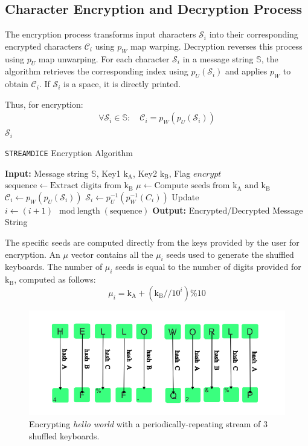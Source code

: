 \documentclass{article}
\begin{document}
\subsection{Character Encryption and Decryption Process}
The encryption process transforms input characters $\mathcal{S}_i$ into their corresponding encrypted characters $\mathcal{C}_i$ using \( p_W \) map warping. Decryption reverses this process using \( p_U \) map unwarping. For each character \( \mathcal{S}_i \) in a message string $\mathbb{S}$, the algorithm retrieves the corresponding index using \( p_U(\mathcal{S}_i) \) and applies \( p_W \) to obtain $\mathcal{C}_i$. If \( \mathcal{S}_i \) is a space, it is directly printed.

Thus, for encryption:
\begin{align}
  \forall \mathcal{S}_i \in \mathbb{S}: \quad \mathcal{C}_i = p_W(p_U(\mathcal{S}_i))
\end{align}$\mathcal{S}_i$
\begin{algorithm}
\caption{\texttt{STREAMDICE} Encryption Algorithm}
\begin{algorithmic}[1]
\State \textbf{Input:} Message string $\mathbb{S}$, Key1 $\mathrm{k_A}$, Key2 $\mathrm{k_B}$, Flag $encrypt$
\State $\text{sequence} \gets \text{Extract digits from } \mathrm{k_B}$
\State $\mu \gets \text{Compute seeds from } \mathrm{k_A} \text{ and } \mathrm{k_B}$
        \State $\mathcal{C}_i \gets p_W(p_U(\mathcal{S}_i))$
    \Else
        \State $\mathcal{S}_i \gets p_U^{-1}(p_W^{-1}(C_i))$
    \EndIf
    \State Update $i \gets (i + 1) \mod \text{length}(\text{sequence})$
\EndFor
\State \textbf{Output:} Encrypted/Decrypted Message String
\end{algorithmic}
\end{algorithm}

The specific seeds are computed directly from the keys provided by the user for encryption. An $\mu$ vector contains all the $\mu_i$ seeds used to generate the shuffled keyboards. The number of $\mu_i$ seeds is equal to the number of digits provided for $\mathrm{k_B}$, computed as follows:
\[
  \mu_i = \mathrm{k_A}  + (\mathrm{k_B} // 10^{i}) \% 10
\]

\begin{figure}[h]
  \centering
  \includegraphics[width=0.7\linewidth]{img/helloworld.png}
  \caption{Encrypting \textit{hello world} with a periodically-repeating stream of 3 shuffled keyboards.}
  \label{fig:helloworld}
\end{figure}
\end{document}
